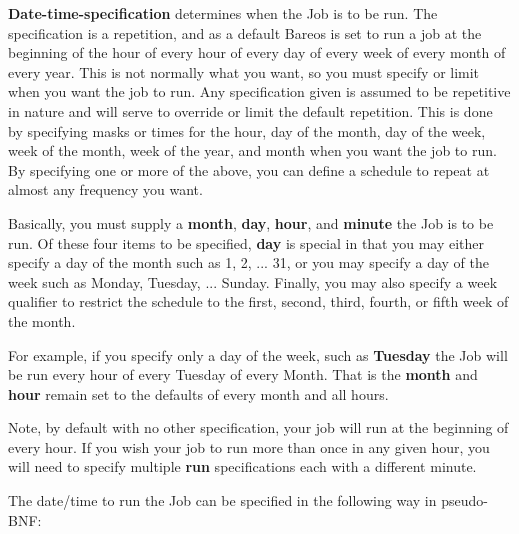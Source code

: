 \begin{description}
\begin{description}
\end{description}

{\bf Date-time-specification} determines when the  Job is to be run. The
specification is a repetition, and as  a default Bareos is set to run a job at
the beginning of the  hour of every hour of every day of every week of every
month  of every year. This is not normally what you want, so you  must specify
or limit when you want the job to run. Any  specification given is assumed to
be repetitive in nature and  will serve to override or limit the default
repetition. This  is done by specifying masks or times for the hour, day of the
month, day of the week, week of the month, week of the year,  and month when
you want the job to run. By specifying one or  more of the above, you can
define a schedule to repeat at  almost any frequency you want.

Basically, you must supply a {\bf month}, {\bf day}, {\bf hour}, and  {\bf
minute} the Job is to be run. Of these four items to be specified,  {\bf day}
is special in that you may either specify a day of the month  such as 1, 2,
... 31, or you may specify a day of the week such  as Monday, Tuesday, ...
Sunday. Finally, you may also specify a  week qualifier to restrict the
schedule to the first, second, third,  fourth, or fifth week of the month.

For example, if you specify only a day of the week, such as {\bf Tuesday}  the
Job will be run every hour of every Tuesday of every Month. That  is the {\bf
month} and {\bf hour} remain set to the defaults of  every month and all
hours.

Note, by default with no other specification, your job will run  at the
beginning of every hour. If you wish your job to run more than  once in any
given hour, you will need to specify multiple {\bf run}  specifications each
with a different minute.

The date/time to run the Job can be specified in the following way  in
pseudo-BNF:


\end{description}
